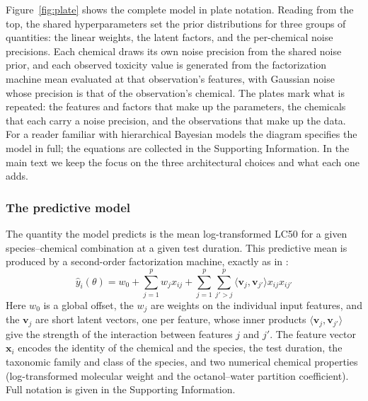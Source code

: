 Figure~\ref{fig:plate} shows the complete model in plate notation. Reading from the top, the shared hyperparameters set the prior distributions for three groups of quantities: the linear weights, the latent factors, and the per-chemical noise precisions. Each chemical draws its own noise precision from the shared noise prior, and each observed toxicity value is generated from the factorization machine mean evaluated at that observation's features, with Gaussian noise whose precision is that of the observation's chemical. The plates mark what is repeated: the features and factors that make up the parameters, the chemicals that each carry a noise precision, and the observations that make up the data. For a reader familiar with hierarchical Bayesian models the diagram specifies the model in full; the equations are collected in the Supporting Information. In the main text we keep the focus on the three architectural choices and what each one adds.

\subsubsection{The predictive model}

The quantity the model predicts is the mean log-transformed LC50 for a given species--chemical combination at a given test duration. This predictive mean is produced by a second-order factorization machine, exactly as in \citet{PosthumaImprovingHazard}:
\begin{equation}
    \hat{y}_i(\theta) = w_0 + \sum_{j=1}^{p} w_j x_{ij} + \sum_{j=1}^{p} \sum_{j' > j}^{p} \langle \mathbf{v}_j, \mathbf{v}_{j'} \rangle x_{ij} x_{ij'}
    \label{eq:fm_mean}
\end{equation}
Here $w_0$ is a global offset, the $w_j$ are weights on the individual input features, and the $\mathbf{v}_j$ are short latent vectors, one per feature, whose inner products $\langle \mathbf{v}_j, \mathbf{v}_{j'} \rangle$ give the strength of the interaction between features $j$ and $j'$. The feature vector $\mathbf{x}_i$ encodes the identity of the chemical and the species, the test duration, the taxonomic family and class of the species, and two numerical chemical properties (log-transformed molecular weight and the octanol--water partition coefficient). Full notation is given in the Supporting Information.

